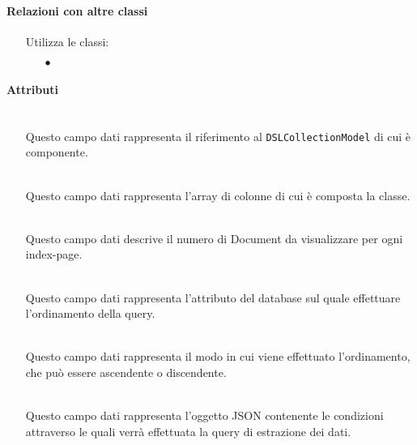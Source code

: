 \paragraph*{Relazioni con altre classi}
\begin{itemize}


\item[] Utilizza le classi:
\begin{itemize}
\item[$\bullet$] 
\end{itemize}
\end{itemize}

\paragraph*{Attributi}
\begin{itemize}
\item[]  \\ Questo campo dati rappresenta il riferimento al \texttt{DSLCollectionModel} di cui è componente.
\item[]  \\ Questo campo dati rappresenta l'array di colonne di cui è composta la classe.
\item[]  \\ Questo campo dati descrive il numero di Document da visualizzare per ogni index-page.
\item[]  \\ Questo campo dati rappresenta l'attributo del database sul quale effettuare l'ordinamento della query.
\item[]  \\ Questo campo dati rappresenta il modo in cui viene effettuato l'ordinamento, che può essere ascendente o discendente.
\item[]  \\ Questo campo dati rappresenta l'oggetto JSON contenente le condizioni attraverso le quali verrà effettuata la query di estrazione dei dati.
\end{itemize}

